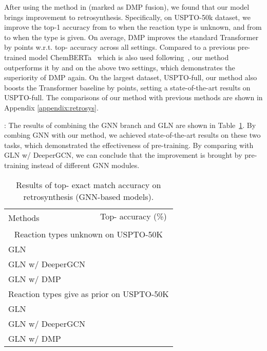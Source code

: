 \documentclass{article}
\newcommand{\ourM}{DMP}
\begin{document}
After using the method in \cite{zhu2020incorporating} (marked as \ourM{} fusion), we found that our model brings improvement to retrosynthesis. Specifically, on USPTO-50k dataset, we improve the top-1 accuracy from  to  when the reaction type is unknown, and from  to  when the type is given. On average, \ourM{} improves the standard Transformer by  points w.r.t. top- accuracy across all settings. Compared to a previous pre-trained model ChemBERTa~\cite{chithrananda2020chemberta} which is also used following~\cite{zhu2020incorporating}, our method outperforms it by  and  on the above two settings, which demonstrates the superiority of \ourM{} again. On the largest dataset, USPTO-full, our method also boosts the Transformer baseline by  points, setting a state-of-the-art results on USPTO-full. The comparisons of our method with previous methods are shown in Appendix \ref{appendix:retrosys}.

: The results of combining the GNN branch and GLN are shown in Table~\ref{tab:retrosys_gnn}. By combing GNN with our method, we achieved state-of-the-art results on these two tasks, which demonstrated the effectiveness of pre-training. By comparing with GLN w/ DeeperGCN, we can conclude that the improvement is brought by pre-training instead of different GNN modules.

\begin{table}[!htbp]
\centering
\small
\begin{tabular}{lcccccc}
\toprule
\multirow{2}{*}{Methods} & \multicolumn{6}{c}{Top- accuracy (\%)}  \\
\cmidrule{2-7}
& &  & & & & \\
\midrule
\multicolumn{7}{c}{Reaction types unknown on USPTO-50K}\\
\midrule
GLN~\citep{GLN} &  &  &  &  &  &  \\
         GLN w/ DeeperGCN &  & &&&&\\
         GLN w/ \ourM{}  &&&&&&\\
\midrule
\multicolumn{7}{c}{Reaction types give as prior on USPTO-50K}\\
\midrule
GLN &  &  &  &  &  &  \\
GLN w/ DeeperGCN &  & &&&&\\
GLN w/ \ourM{}  &&&&&&\\
         \bottomrule
    \end{tabular}
    \caption{Results of top- exact match accuracy on retrosynthesis (GNN-based models).}
    \label{tab:retrosys_gnn}
\end{table}
\end{document}
